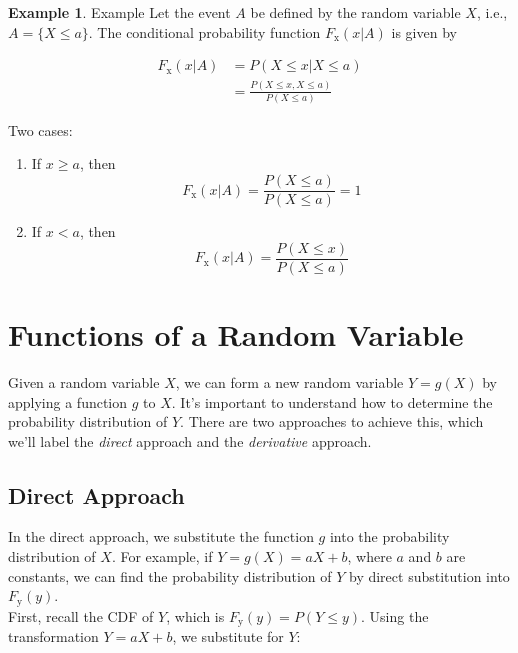 \documentclass[12pt]{book}
\theoremstyle{definition}
\newtheorem{exmp}{Example}[chapter]
\begin{document}
\begin{tcolorbox}
    \begin{exmp}
        {Example}
    Let the event \(A\) be defined by the random variable \(X\), i.e., \(A = \{X \leq a\}\). The conditional probability function \(F_\mathrm{x}(x|A)\) is given by 
   
       
\[
 \begin{aligned}
        F_\mathrm{x}(x|A) & = P(X \le x| X \le a) \\
        & = \frac{P(X \le x , X \le a)}{P(X \le a)}
    \end{aligned}
\]

Two cases:
\begin{enumerate}
    \item If \(x \ge a\), then 
    \[F_\mathrm{x}(x|A) = \frac{P(X \le a)}{P(X \le a)} = 1\]
     \item If \(x < a\), then 
    \[F_\mathrm{x}(x|A) = \frac{P(X \le x)}{P(X \le a)}\]
\end{enumerate}
    \end{exmp}
\end{tcolorbox}



\section{Functions of a Random Variable}

Given a random variable \(X\), we can form a new random variable \(Y = g(X)\) by applying a function \(g\) to \(X\). It's important to understand how to determine the probability distribution of \(Y\). There are two approaches to achieve this, which we'll label the \emph{direct} approach and the \emph{derivative} approach.

\subsection{Direct Approach}

In the direct approach, we substitute the function \(g\) into the probability distribution of \(X\). For example, if \(Y = g(X) = aX + b\), where \(a\) and \(b\) are constants, we can find the probability distribution of \(Y\) by direct substitution into \(F_\mathrm{y}(y)\).\\


First, recall the CDF of \(Y\), which is \(F_\mathrm{y}(y) = P(Y \leq y)\). Using the transformation \(Y = aX + b\), we substitute for \(Y\):
\end{document}

